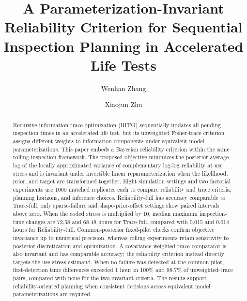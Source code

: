 \documentclass[a4paper,fleqn]{cas-sc}
\begin{document}
\let\WriteBookmarks\relax
\renewcommand{\topfraction}{0.95}
\renewcommand{\floatpagefraction}{0.75}
\renewcommand{\textfraction}{0.05}


\title[mode=title]{A Parameterization-Invariant Reliability Criterion for Sequential Inspection Planning in Accelerated Life Tests}

\author[1]{Wenhan Zhang}
\author[2]{Xiaojun Zhu}
\cormark[1]


\begin{abstract}
Recursive information trace optimization (RITO) sequentially updates all pending inspection times in an accelerated life test, but its unweighted Fisher-trace criterion assigns different weights to information components under equivalent model parameterizations. This paper embeds a Bayesian reliability criterion within the same rolling inspection framework. The proposed objective minimizes the posterior average log of the locally approximated variance of complementary log-log reliability at use stress and is invariant under invertible linear reparameterization when the likelihood, prior, and target are transformed together. Eight simulation settings and two factorial experiments use 1000 matched replicates each to compare reliability and trace criteria, planning horizons, and inference choices. Reliability-full has accuracy comparable to Trace-full; only sparse-failure and shape-prior-offset settings show paired intervals above zero. When the coded stress is multiplied by 10, median maximum inspection-time changes are 72.58 and 68.48 hours for Trace-full, compared with 0.015 and 0.014 hours for Reliability-full. Common-posterior fixed-pilot checks confirm objective invariance up to numerical precision, whereas rolling experiments retain sensitivity to posterior discretization and optimization. A covariance-weighted trace comparator is also invariant and has comparable accuracy; the reliability criterion instead directly targets the use-stress estimand. When no failure was detected at the common pilot, first-detection time differences exceeded 1 hour in 100\% and 98.7\% of unweighted-trace pairs, compared with none for the two invariant criteria. The results support reliability-oriented planning when consistent decisions across equivalent model parameterizations are required.
\end{abstract}
\end{document}
